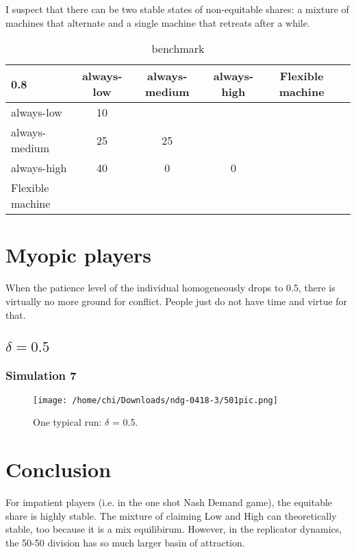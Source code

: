 \documentclass[12.5pt]{report}
\begin{document}
I suspect that there can be two stable states of non-equitable shares: a mixture of machines that alternate and a single machine that retreats after a while.


\begin{table}[h!]
\center
\begin{tabular}{l|ccccc}
\textbf{0.8}& always-low & always-medium & always-high & Flexible machine\\
\hline
always-low    & 10 &     &    &   \\
always-medium & 25 & 25 &    & \\
always-high   & 40 &  0  & 0  & \\
Flexible machine  &     &     &  & \\
\end{tabular}
\caption{benchmark}
\end{table}




\section{Myopic players}
When the patience level of the individual homogeneously drops to 0.5, there is virtually no more ground for conflict. People just do not have time and virtue for that.

\subsection{$\delta = 0.5$}

\subsubsection{Simulation 7}

\begin{figure}
\center
\texttt{[image: /home/chi/Downloads/ndg-0418-3/501pic.png]}
\caption{One typical run: $\delta$ = 0.5.}
\end{figure}

\section{Conclusion}

For impatient players (i.e. in the one shot Nash Demand game), the equitable share is highly stable. The mixture of claiming Low and High can theoretically stable, too because it is a mix equilibirum. However, in the replicator dynamics, the 50-50 division has so much larger basin of attraction. \\
\end{document}
